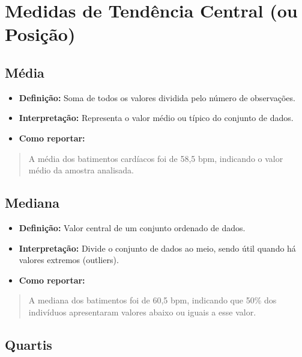 \documentclass[
]{book}
\providecommand{\tightlist}{%
  \setlength{\itemsep}{0pt}\setlength{\parskip}{0pt}}
\begin{document}
\section{Medidas de Tendência Central (ou Posição)}\label{medidas-de-tenduxeancia-central-ou-posiuxe7uxe3o}

\subsection{Média}\label{muxe9dia}

\begin{itemize}
\tightlist
\item
  \textbf{Definição:} Soma de todos os valores dividida pelo número de observações.\\
\item
  \textbf{Interpretação:} Representa o valor médio ou típico do conjunto de dados.\\
\item
  \textbf{Como reportar:}
\end{itemize}

\begin{quote}
A média dos batimentos cardíacos foi de 58,5 bpm, indicando o valor médio da amostra analisada.
\end{quote}

\subsection{Mediana}\label{mediana}

\begin{itemize}
\tightlist
\item
  \textbf{Definição:} Valor central de um conjunto ordenado de dados.\\
\item
  \textbf{Interpretação:} Divide o conjunto de dados ao meio, sendo útil quando há valores extremos (outliers).\\
\item
  \textbf{Como reportar:}
\end{itemize}

\begin{quote}
A mediana dos batimentos foi de 60,5 bpm, indicando que 50\% dos indivíduos apresentaram valores abaixo ou iguais a esse valor.
\end{quote}

\subsection{Quartis}\label{quartis}
\end{document}
